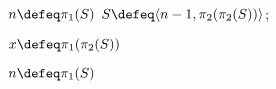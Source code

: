         \begin{multicols}{2}
            \begin{pseudo}
                $n \defeq \pi_1(S)$\;
                 {
                    $S \defeq \langle n-1, \pi_2(\pi_2(S)) \rangle$;
                }
                \caption{$pop \left( S \right)$}
            \end{pseudo}
        \end{multicols}

        \begin{multicols}{2}
            \begin{pseudo}
                $x \defeq \pi_1(\pi_2 (S))$\;
                \caption{$x = top \left( S \right)$}
            \end{pseudo}
        \end{multicols}

        \begin{multicols}{2}
            \begin{pseudo}
                $n \defeq \pi_1(S)$\;
                \caption{$b = isempty \left( S \right)$}
            \end{pseudo}
        \end{multicols}


    \newpage

